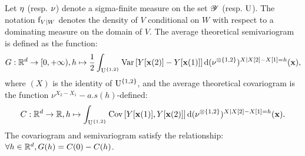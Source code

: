 Let $\eta$ (resp. $\nu$) denote a sigma-finite measure on the set $\mathscr{Y}$ (resp. $\mathrm{U}$).
The notation $\mathrm{f}_{V\mid W}$ denotes the density of $V$ conditional on $W$ with respect to a dominating measure on the domain of $V$.
The average theoretical semivariogram is defined as the function: 
\begin{equation}G:\mathbb{R}^d\to[0,+\infty),h\mapsto\frac12\int_{\mathrm{U}^{\{1,2\}}} \mathrm{Var}\left[Y[\mathbf{x}(2)]-Y[\mathbf{x}(1)]\right] \mathrm{d}(\nu^{\otimes \{1,2\}})^{X\mid X[2]-X[1]=h}(\mathbf{x}),\label{eq:averagesemivariogram}\end{equation} 
where $(X)$ is the identity of $\mathrm{U}^{\{1,2\}}$, and the average theoretical covariogram is the function  $\nu^{X_2-X_1}-a.s(h)$-defined:
\begin{equation}C:\mathbb{R}^d\to\mathbb{R}, h\mapsto\int_{\mathrm{U}^{\{1,2\}}} \mathrm{Cov}\left[Y[\mathbf{x}(1)],Y[\mathbf{x}(2)]\right] \mathrm{d}(\nu^{\otimes \{1,2\}})^{X\mid X[2]-X[1]=h}(\mathbf{x}).\label{eq:averagecovariogram}\end{equation} The covariogram and semivariogram satisfy the relationship: $\forall h\in\mathbb{R}^d, G(h)=C(0)-C(h)$.


